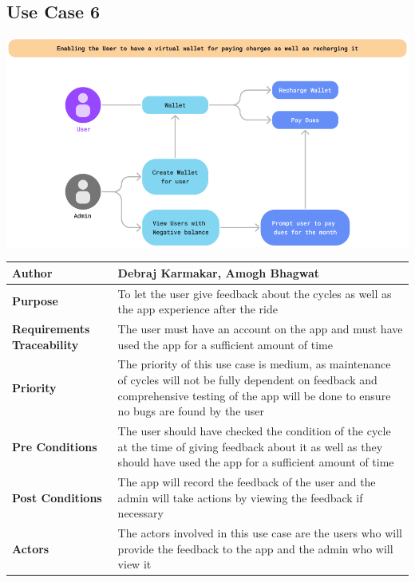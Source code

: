 \documentclass{scrreprt}
\begin{document}
\subsection{Use Case 6}
\begin{center}
\includegraphics*[scale=0.6]{usecase-6.png}\\
\vspace{5mm}
\begin{tabular}{|l|p{10cm}|}
    \hline
    \textbf{Author} & Debraj Karmakar, Amogh Bhagwat\\
    \hline
    \textbf{Purpose} & To let the user give feedback about the cycles as well as the app experience after the ride \\
    \hline
    \textbf{Requirements Traceability} & The user must have an account on the app and must have used the app for a sufficient amount of time\\
    \hline
    \textbf{Priority} & The priority of this use case is medium, as maintenance of cycles will not be fully dependent on feedback and comprehensive testing of the app will be done to ensure no bugs are found by the user\\
    \hline
    \textbf{Pre Conditions} & The user should have checked the condition of the cycle at the time of giving feedback about it as well as they should have used the app for a sufficient amount of time\\
    \hline
    \textbf{Post Conditions} & The app will record the feedback of the user and the admin will take actions by viewing the feedback if necessary\\
    \hline
    \textbf{Actors} & The actors involved in this use case are the users who will provide the feedback to the app and the admin who will view it\\
    \hline
\end{tabular}
\end{center}
\end{document}
